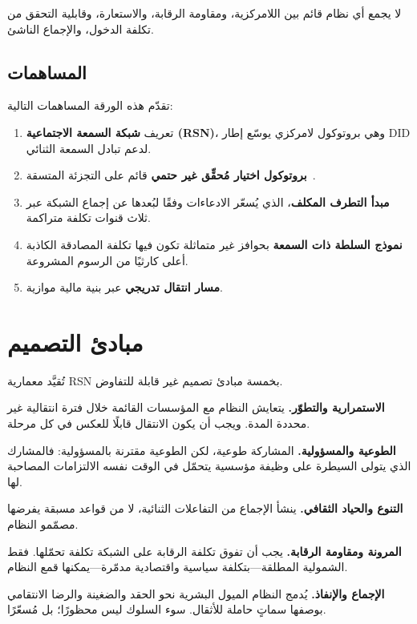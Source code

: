 \documentclass[11pt,a4paper,twocolumn]{article}
\begin{document}
لا يجمع أي نظام قائم بين اللامركزية، ومقاومة الرقابة، والاستعارة، وقابلية التحقق من تكلفة الدخول، والإجماع الناشئ.

\subsection{المساهمات}

تقدّم هذه الورقة المساهمات التالية:
\begin{enumerate}[nosep]
\item تعريف \textbf{شبكة السمعة الاجتماعية (RSN)}، وهي بروتوكول لامركزي يوسّع إطار DID لدعم تبادل السمعة الثنائي.
\item \textbf{بروتوكول اختيار مُحقِّق غير حتمي} قائم على التجزئة المتسقة~\cite{karger1997}.
\item \textbf{مبدأ التطرف المكلف}، الذي يُسعّر الادعاءات وفقًا لبُعدها عن إجماع الشبكة عبر ثلاث قنوات تكلفة متراكمة.
\item \textbf{نموذج السلطة ذات السمعة} بحوافز غير متماثلة تكون فيها تكلفة المصادقة الكاذبة أعلى كارثيًا من الرسوم المشروعة.
\item \textbf{مسار انتقال تدريجي} عبر بنية مالية موازية.
\end{enumerate}

\section{مبادئ التصميم}

تُقيَّد معمارية RSN بخمسة مبادئ تصميم غير قابلة للتفاوض.

\textbf{الاستمرارية والتطوّر.} يتعايش النظام مع المؤسسات القائمة خلال فترة انتقالية غير محددة المدة. ويجب أن يكون الانتقال قابلًا للعكس في كل مرحلة.

\textbf{الطوعية والمسؤولية.} المشاركة طوعية، لكن الطوعية مقترنة بالمسؤولية: فالمشارك الذي يتولى السيطرة على وظيفة مؤسسية يتحمّل في الوقت نفسه الالتزامات المصاحبة لها.

\textbf{التنوع والحياد الثقافي.} ينشأ الإجماع من التفاعلات الثنائية، لا من قواعد مسبقة يفرضها مصمّمو النظام.

\textbf{المرونة ومقاومة الرقابة.} يجب أن تفوق تكلفة الرقابة على الشبكة تكلفة تحمّلها. فقط الشمولية المطلقة---بتكلفة سياسية واقتصادية مدمّرة---يمكنها قمع النظام.

\textbf{الإجماع والإنفاذ.} يُدمج النظام الميول البشرية نحو الحقد والضغينة والرضا الانتقامي بوصفها سماتٍ حاملة للأثقال. سوء السلوك ليس محظورًا؛ بل مُسعّرًا.
\end{document}
